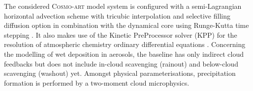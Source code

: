 The considered  \textsc{Cosmo-art} model  system is configured  with a
semi-Lagrangian    horizontal   advection    scheme    with   tricubic
interpolation  and selective filling  diffusion option  in combination
with   the   dynamical    core   using   Runge-Kutta   time   stepping
\citep{COSMO-PartI-2011}.    It  also   makes  use   of   the  Kinetic
PreProcessor solver (KPP) for  the resolution of atmospheric chemistry
ordinary  differential equations \citep{Damian-2002}.   Concerning the
modelling  of  wet  deposition  in  aerosols, the  baseline  has  only
indirect  cloud feedbacks  but  does not  include in-cloud  scavenging
(rainout) and below-cloud  scavenging (washout) yet.  Amongst physical
parameterisations,   precipitation  formation   is   performed  by   a
two-moment cloud microphysics.
